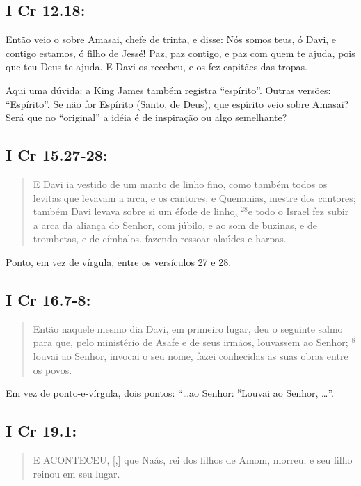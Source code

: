 \subsection*{I Cr 12.18:} 
  Então veio o  sobre Amasai, chefe de trinta, e disse: Nós somos teus, ó Davi, e contigo estamos, ó filho de Jessé! Paz, paz contigo, e paz com quem te ajuda, pois que teu Deus te ajuda. E Davi os recebeu, e os fez capitães das tropas.

Aqui uma dúvida: a King James também registra ``espírito''. Outras
versões: ``Espírito''. Se não for Espírito (Santo, de Deus), que
espírito veio sobre Amasai? Será que no ``original'' a idéia é de
inspiração ou algo semelhante?

\subsection*{I Cr 15.27-28:} 
\begin{quote}
    \small
E Davi ia vestido de um manto de linho fino, como também todos os levitas que levavam a arca, e os cantores, e Quenanias, mestre dos cantores; também Davi levava sobre si um éfode de linho\uline{,} $^{\mathrm{28}}$e todo o Israel fez subir a arca da aliança do Senhor, com júbilo, e ao som de buzinas, e de trombetas, e de címbalos, fazendo ressoar alaúdes e harpas.
\end{quote}

Ponto, em vez de vírgula, entre os versículos 27 e 28.

\subsection*{I Cr 16.7-8:} 
\begin{quote}
    \small
Então naquele mesmo dia Davi, em primeiro lugar, deu o seguinte salmo para que, pelo ministério de Asafe e de seus irmãos, louvassem ao Senhor\uline{;} $^{\mathrm{8}}$\uline{l}ouvai ao Senhor, invocai o seu nome, fazei conhecidas as suas obras entre os povos.
\end{quote}

Em vez de ponto-e-vírgula, dois pontos: ``\ldots ao Senhor: $^{\mathrm{8}}$Louvai ao Senhor, \ldots''.


\subsection*{I Cr 19.1:} 
\begin{quote}
    \small
 E ACONTECEU, [,] que Naás, rei dos filhos de Amom, morreu; e seu filho reinou em seu lugar.
 \end{quote}


